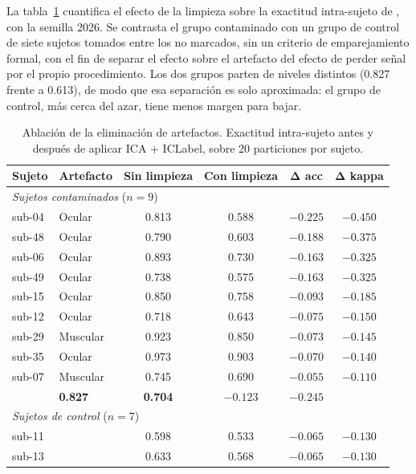 La tabla~\ref{tab:ablacion} cuantifica el efecto de la limpieza sobre la
exactitud intra-sujeto de \eegnet{}, con la semilla 2026. Se contrasta el grupo contaminado
con un grupo de control de siete sujetos tomados entre los no marcados, sin un criterio de
emparejamiento formal, con el fin de separar el efecto sobre el artefacto del efecto de
perder señal por el propio procedimiento. Los dos grupos parten de niveles distintos
(0.827 frente a 0.613), de modo que esa separación es solo aproximada: el grupo de control,
más cerca del azar, tiene menos margen para bajar.

\begin{table}[H]
\centering
\caption{Ablación de la eliminación de artefactos. Exactitud intra-sujeto antes
y después de aplicar ICA + ICLabel, sobre 20 particiones por sujeto.}
\label{tab:ablacion}
\begin{tabular}{llcccc}
\toprule
\textbf{Sujeto} & \textbf{Artefacto} & \textbf{Sin limpieza} & \textbf{Con limpieza}
  & $\boldsymbol{\Delta}$\textbf{ acc} & $\boldsymbol{\Delta}$\textbf{ kappa} \\
\midrule
\multicolumn{6}{l}{\textit{Sujetos contaminados} ($n=9$)} \\
\addlinespace[2pt]
sub-04 & Ocular   & 0.813 & 0.588 & $-0.225$ & $-0.450$ \\
sub-48 & Ocular   & 0.790 & 0.603 & $-0.188$ & $-0.375$ \\
sub-06 & Ocular   & 0.893 & 0.730 & $-0.163$ & $-0.325$ \\
sub-49 & Ocular   & 0.738 & 0.575 & $-0.163$ & $-0.325$ \\
sub-15 & Ocular   & 0.850 & 0.758 & $-0.093$ & $-0.185$ \\
sub-12 & Ocular   & 0.718 & 0.643 & $-0.075$ & $-0.150$ \\
sub-29 & Muscular & 0.923 & 0.850 & $-0.073$ & $-0.145$ \\
sub-35 & Ocular   & 0.973 & 0.903 & $-0.070$ & $-0.140$ \\
sub-07 & Muscular & 0.745 & 0.690 & $-0.055$ & $-0.110$ \\
\addlinespace[3pt]
\multicolumn{2}{l}{\textbf{Media}} & \textbf{0.827} & \textbf{0.704}
  & $\boldsymbol{-0.123}$ & $\boldsymbol{-0.245}$ \\
\midrule
\multicolumn{6}{l}{\textit{Sujetos de control} ($n=7$)} \\
\addlinespace[2pt]
sub-11 &       & 0.598 & 0.533 & $-0.065$ & $-0.130$ \\
sub-13 &       & 0.633 & 0.568 & $-0.065$ & $-0.130$ \\

\end{tabular}
\end{table}
